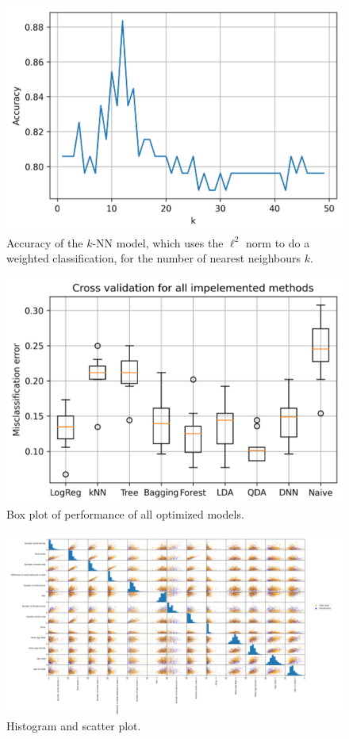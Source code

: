 \documentclass{article}
\begin{document}
\begin{figure}[ht!]
    \centering
    \includegraphics[width=.7\linewidth]{img/k_acc.png}
    \caption{Accuracy of the $k$-NN model, which uses the $\ell^2$ norm to do a weighted classification, for the number of nearest neighbours $k$.}
    \label{fig:k_acc}
\end{figure}

\begin{figure}[ht!]
    \centering
    \includegraphics[width=.7\linewidth]{img/crossval.png}
    \caption{Box plot of performance of all optimized models.}
    \label{fig:cross}
\end{figure}

\newpage

\begin{landscape}
\begin{figure}[ht!]
    \centering
    \includegraphics[width=240mm]{img/minmaxscale_hist_scatt.png}
    \caption{Histogram and scatter plot.}
    \label{fig:scatter}
\end{figure}
\end{landscape}
\end{document}
